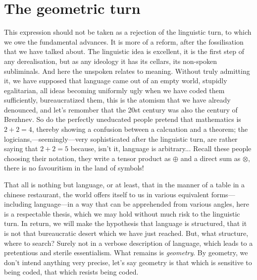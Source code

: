\documentclass{article}
\begin{document}
\section{The geometric turn}
This expression should not be taken as a rejection of the linguistic turn, to which we owe the fundamental advances. It is more of a reform, after the fossilisation that we have talked about. The linguistic idea is excellent, it is the first step of any derealisation, but as any ideology it has its cellars, its non-spoken subliminals. And here the unspoken relates to meaning. Without truly admitting it, we have supposed that language came out of an empty world, stupidly egalitarian, all ideas becoming uniformly ugly when we have coded them sufficiently, bureaucratized them, this is the atomism that we have already denounced, and let's remomber that the 20st century was also the century of Brezhnev. So do the perfectly uneducated people pretend that mathematics is $2+2=4$, thereby showing a confusion between a calcuation and a theorem; the logicians,---seemingly---very sophisticated after the linguistic turn, are rather saying that $2+2=5$ because, isn't it, language is arbitrary... Recall these people choosing their notation, they write a tensor product as $\oplus$ and a direct sum as $\otimes$, there is no favouritism in the land of symbols!

That all is nothing but language, or at least, that in the manner of a table in a chinese restaurant, the world offers itself to us in various equivalent forms---including language---in a way that can be apprehended from various angles, here is a respectable thesis, which we may hold without much risk to the linguistic turn. In return, we will make the hypothesis that language is structured, that it is not that bureaucratic desert which we have just reached. But, what structure, where to search? Surely not in a verbose description of language, which leads to a pretentious and sterile essentialism. What remains is \emph{geometry}. By geometry, we don't intend anything very precise, let's say geometry is that which is sensitive to being coded, that which resists being coded.
\end{document}
